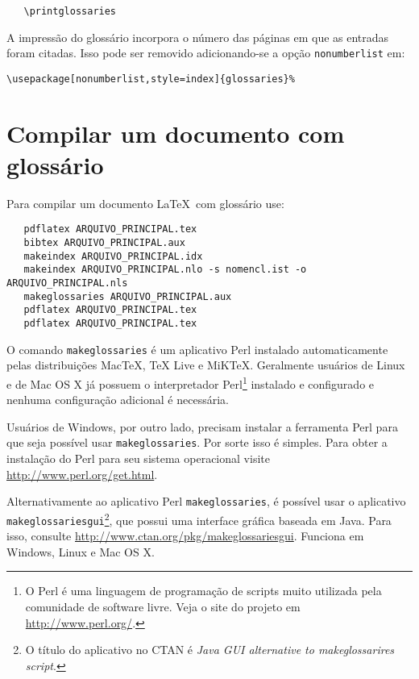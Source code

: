 \documentclass[
	12pt,				%
	openright,			%
	twoside,			%
	a4paper,			%
	english,			%
	french,				%
	spanish,			%
	brazil,				%
	]{abntex2}
\begin{document}
\begin{verbatim}
   \printglossaries
\end{verbatim}

A impressão do glossário incorpora o número das páginas em que as entradas foram
citadas. Isso pode ser removido adicionando-se a opção \texttt{nonumberlist} em:

\begin{verbatim}
\usepackage[nonumberlist,style=index]{glossaries}%
\end{verbatim}

\section{Compilar um documento com glossário}
\label{sec-compilar-glossario}
 
Para compilar um documento \LaTeX\ com glossário use:

\begin{verbatim}
   pdflatex ARQUIVO_PRINCIPAL.tex
   bibtex ARQUIVO_PRINCIPAL.aux
   makeindex ARQUIVO_PRINCIPAL.idx 
   makeindex ARQUIVO_PRINCIPAL.nlo -s nomencl.ist -o ARQUIVO_PRINCIPAL.nls
   makeglossaries ARQUIVO_PRINCIPAL.aux
   pdflatex ARQUIVO_PRINCIPAL.tex
   pdflatex ARQUIVO_PRINCIPAL.tex
\end{verbatim}
 
O comando \texttt{makeglossaries} é um aplicativo Perl instalado
automaticamente pelas distribuições MacTeX, TeX Live e MiKTeX. Geralmente
usuários de Linux e de Mac OS X já possuem o interpretador Perl\footnote{O Perl
é uma linguagem de programação de scripts muito utilizada pela comunidade de
software livre. Veja o site do projeto em \url{http://www.perl.org/}.} instalado
e configurado e nenhuma configuração adicional é necessária.

Usuários de Windows, por outro lado, precisam instalar a ferramenta Perl para
que seja possível usar \texttt{makeglossaries}. Por sorte isso é simples. Para
obter a instalação do Perl para seu sistema operacional visite \url{http://www.perl.org/get.html}.

Alternativamente ao aplicativo Perl \texttt{makeglossaries}, é possível usar o
aplicativo \texttt{makeglossariesgui}\footnote{O título do aplicativo no CTAN
é \textit{Java GUI alternative to makeglossarires script}.}, que possui uma
interface gráfica baseada em Java. Para isso, consulte
\url{http://www.ctan.org/pkg/makeglossariesgui}. Funciona em Windows,
Linux e Mac OS X.

\end{document}
